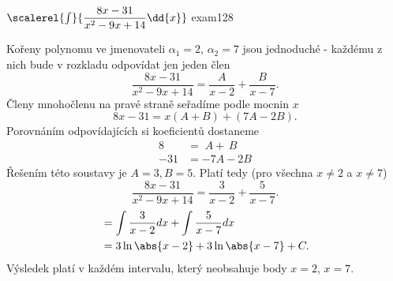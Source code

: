 \begin{mathexam}{\(\protect\scalerel{\int}{\dfrac{8x-31}{x^2-9x+14}\dd{x}}\) \hfill
  \cite[s.~90]{Knichal}}{exam128} 
  
  Kořeny polynomu ve jmenovateli $\alpha_1 = 2$, $\alpha_2 = 7$ jsou jednoduché - každému z nich
  bude v rozkladu odpovídat jen jeden člen $$\frac{8x-31}{x^2-9x+14} = \frac{A}{x-2} +
  \frac{B}{x-7}.$$ Členy mnohočlenu na pravé straně seřadíme podle mocnin $x$ $$8x-31 =
  x(A+B)+(7A-2B).$$ Porovnáním odpovídajících si koeficientů dostaneme
  \begin{align*}
    8   &=   \; A + \, B \\
    -31 &= -7A - 2B
  \end{align*}
  Řešením této soustavy je $A = 3, B = 5$. Platí tedy (pro všechna $x \neq 2$ a $x \neq 7$)
  $$\frac{8x-31}{x^2-9x+14} = \frac{3}{x-2} + \frac{5}{x-7}.$$
  \begin{align*}
      &= \int{\frac{3}{x-2}}dx + \int{\frac{5}{x-7}}dx      \\
      &= 3\ln\abs{x-2} + 3\ln\abs{x-7} + C.
  \end{align*}
  Výsledek platí v každém intervalu, který neobsahuje body \(x = 2\), \(x = 7\).
\end{mathexam}